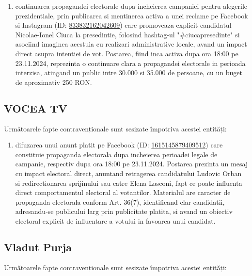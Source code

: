 \documentclass[a4paper,12pt]{article}
\begin{document}
\begin{enumerate}[leftmargin=*, label=\arabic*.)]
    \item continuarea propagandei electorale dupa incheierea campaniei pentru alegerile prezidentiale, prin publicarea si mentinerea activa a unei reclame pe Facebook si Instagram (ID: \href{https://www.facebook.com/ads/library/?id=833832162042609}{833832162042609}) care promoveaza explicit candidatul Nicolae-Ionel Ciuca la presedintie, folosind hashtag-ul "\#ciucapresedinte" si asociind imaginea acestuia cu realizari administrative locale, avand un impact direct asupra intentiei de vot. Postarea, fiind inca activa dupa ora 18:00 pe 23.11.2024, reprezinta o continuare clara a propagandei electorale in perioada interzisa, atingand un public intre 30.000 si 35.000 de persoane, cu un buget de aproximativ 250 RON.
\end{enumerate}

\vspace{0.5cm}

\subsection{VOCEA TV}
Următoarele fapte contravenționale sunt sesizate împotriva acestei entități:

\begin{enumerate}[leftmargin=*, label=\arabic*.)]
    \item difuzarea unui anunt platit pe Facebook (ID: \href{https://www.facebook.com/ads/library/?id=1615145879409512}{1615145879409512}) care constituie propaganda electorala dupa incheierea perioadei legale de campanie, respectiv dupa ora 18:00 pe 23.11.2024. Postarea prezinta un mesaj cu impact electoral direct, anuntand retragerea candidatului Ludovic Orban si redirectionarea sprijinului sau catre Elena Lasconi, fapt ce poate influenta direct comportamentul electoral al votantilor. Materialul are caracter de propaganda electorala conform Art. 36(7), identificand clar candidatii, adresandu-se publicului larg prin publicitate platita, si avand un obiectiv electoral explicit de influentare a votului in favoarea unui candidat.
\end{enumerate}

\vspace{0.5cm}

\subsection{Vladut Purja}
Următoarele fapte contravenționale sunt sesizate împotriva acestei entități:
\end{document}
